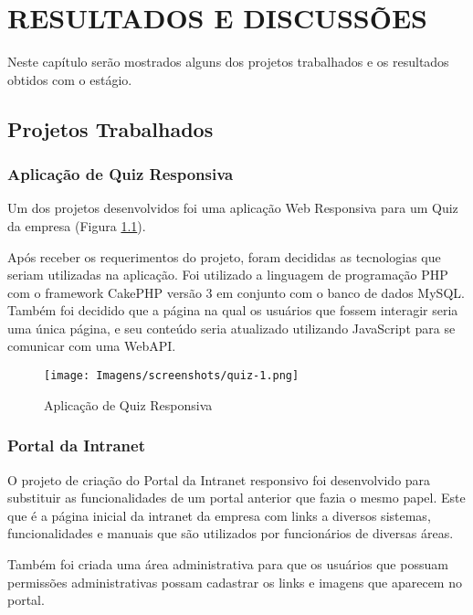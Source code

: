 \chapter{RESULTADOS E DISCUSSÕES} \label{cap:result}

Neste capítulo serão mostrados alguns dos projetos trabalhados e os resultados obtidos com o estágio.

\section{Projetos Trabalhados}

\subsection{Aplicação de Quiz Responsiva}

Um dos projetos desenvolvidos foi uma aplicação Web Responsiva para um Quiz da empresa (Figura \ref{fig:quiz-1}). 



Após receber os requerimentos do projeto, foram decididas as tecnologias que seriam utilizadas na aplicação. Foi utilizado a linguagem de programação PHP com o framework CakePHP versão 3 em conjunto com o banco de dados MySQL. Também foi decidido que a página na qual os usuários que fossem interagir seria uma única página, e seu conteúdo seria atualizado utilizando JavaScript para se comunicar com uma WebAPI.

\begin{figure}[h!]
  \centering
  \texttt{[image: Imagens/screenshots/quiz-1.png]}
  \caption[Aplicação de Quiz Responsiva]{Aplicação de Quiz Responsiva}
  \label{fig:quiz-1}
\end{figure}

\subsection{Portal da Intranet}

O projeto de criação do Portal da Intranet responsivo foi desenvolvido para substituir as funcionalidades de um portal anterior que fazia o mesmo papel. Este que é a página inicial da intranet da empresa com links a diversos sistemas, funcionalidades e manuais que são utilizados por funcionários de diversas áreas.

Também foi criada uma área administrativa para que os usuários que possuam permissões administrativas possam cadastrar os links e imagens que aparecem no portal. 

